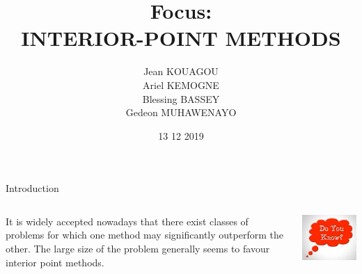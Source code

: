 \documentclass{beamer}
\title{Focus: \\ INTERIOR-POINT METHODS}
\author{\small  Jean KOUAGOU\\ Ariel KEMOGNE \\ Blessing BASSEY \\ Gedeon MUHAWENAYO}
\institute{African Masters for Machine Learning}%
\date{13 12 2019}
\begin{document}
\tableofcontents
\begin{frame}
	\maketitle %
\end{frame}



%		
	

\begin{frame}{Introduction}
	\begin{columns}
			It is widely accepted nowadays that there exist classes of problems for which one method may \alert{significantly outperform} the other. The large size of the problem generally seems to favour interior point methods. 
		
			\includegraphics[width=\linewidth]{Images/DO.jpeg}
	\end{columns}
\end{frame}
\end{document}

